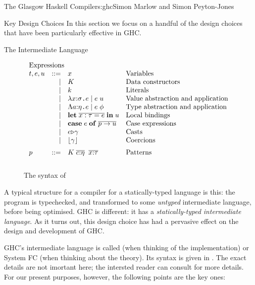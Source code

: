 \begin{aosachapter}{The Glasgow Haskell Compiler}{s:ghc}{Simon Marlow and Simon Peyton-Jones}
\begin{aosasect1}{Key Design Choices}
In this section we focus on a handful of the design choices that have
been particularly effective in GHC.

\begin{aosasect2}{The Intermediate Language}
\label{s:core}

\begin{figure}
$$
\begin{array}{lrll}
\multicolumn{3}{l}{\text{Expressions}} \\
t,e,u & ::= & x  & \text{Variables} \\
      & \mid & K & \text{Data constructors} \\ 
      & \mid & k & \text{Literals} \\
      & \mid & \lambda x{:}\sigma \code{.} e \mid e\;u 
             & \text{Value abstraction and application} \\ 
    & \mid   &  \Lambda a{:}\eta \code{.} e \mid e\;\phi
             & \text{Type abstraction and application} \\ 
    & \mid    & \mathbf{let}\;\ol{x:\tau = e}\;\mathbf{in}\;u 
             & \text{Local bindings} \\ 
    & \mid    & \tcase{e}{p \to u} 
             & \text{Case expressions} \\ 
    & \mid    & \tcast{e}{\gamma}         &  \text{Casts} \\
    & \mid    & \clift{\gamma}            &  \text{Coercions} \\[2mm] 
 p  & ::=     & K\; \ol{c{:}\eta}\;\;\ol{x{:}\tau} & \text{Patterns} \\[3mm]
\end{array} 
$$
\label{fig:core-syntax}
\caption{The syntax of }
\end{figure}

A typical structure for a compiler for a statically-typed language is
this: the program is typechecked, and transformed to some
\emph{untyped} intermediate language, before being optimised.  GHC is
different: it has a \emph{statically-typed intermediate language}.  As
it turns out, this design choice has had a pervasive effect on the
design and development of GHC.

GHC's intermediate language is called  (when thinking of the
implementation) or System FC (when thinking about the theory).  Its
syntax is given in .  The exact details
are not imortant here; the intersted reader can consult
\cite{bib:system-f} for more details.  For our present purposes,
however, the following points are the key ones:


\end{aosasect2}
\end{aosasect1}
\end{aosachapter}
